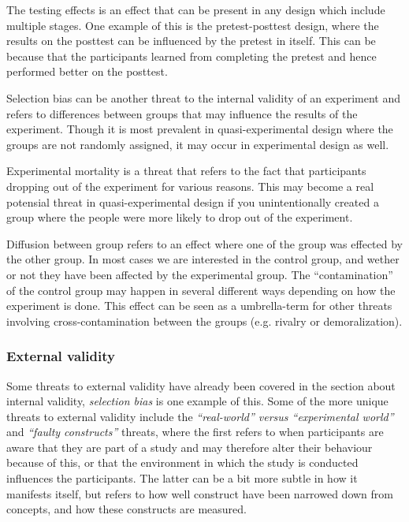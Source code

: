 	\bigskip\noindent
	The testing effects is an effect that can be present in any design which include multiple stages. 
	One example of this is the pretest-posttest design, where the results on the posttest can be influenced by the pretest in itself. 
	This can be because that the participants learned from completing the pretest and hence performed better on the posttest.
	
	\bigskip\noindent
	Selection bias can be another threat to the internal validity of an experiment and refers to differences between groups that may influence the results of the experiment. Though it is most prevalent in quasi-experimental design where the groups are not randomly assigned, it may occur in experimental design as well. 
	
	\bigskip\noindent
	Experimental mortality is a threat that refers to the fact that participants dropping out of the experiment for various reasons. This may become a real potensial threat in quasi-experimental design if you unintentionally created a group where the people were more likely to drop out of the experiment.
	
	\bigskip\noindent
	Diffusion between group refers to an effect where one of the group was effected by the other group. In most cases we are interested in the control group, and wether or not they have been affected by the experimental group. The "`contamination"' of the control group may happen in several different ways depending on how the experiment is done. 
	This effect can be seen as a umbrella-term for other threats involving cross-contamination between the groups (e.g. rivalry or demoralization).
	
	\subsubsection{External validity}
	Some threats to external validity have already been covered in the section about internal validity, \textit{selection bias} is one example of this. 
	Some of the more unique threats to external validity include the \textit{"`real-world"' versus "`experimental world"'} and \textit{"`faulty constructs"'} threats, where the first refers to when participants are aware that they are part of a study and may therefore alter their behaviour because of this, or that the environment in which the study is conducted influences the participants. The latter can be a bit more subtle in how it manifests itself, but refers to how well construct have been narrowed down from concepts, and how these constructs are measured.
	

